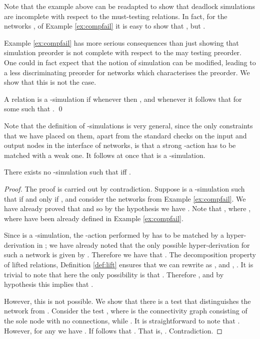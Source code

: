 \documentclass{LMCS}
\begin{document}
  Note that the example above can be readapted to show that 
  deadlock simulations are incomplete with respect to the 
  must-testing relations. 
  In fact, for the networks ,  of 
  Example \ref{ex:compfail} it is easy to show that 
  , but 
  . 
  
 Example \ref{ex:compfail} has more serious consequences than just showing that simulation 
  preorder is not complete with respect to the may testing preorder. 
  One could in fact expect that the notion of simulation can be modified, 
  leading to a less discriminating preorder for networks which characterises 
  the  preorder. We show that this is not the case. 
  
  \begin{defi}[-Simulations]
  A relation  is 
  a -simulation if whenever  then 
  ,  
  and whenever  it follows that 
   for some  such that 
  . \qed
  \end{defi}
  Note that the definition of -simulations is very general, 
  since the only constraints that we have placed on them, 
  apart from the standard checks on the input and output nodes 
  in the interface of networks, is that a strong -action 
  has to be matched with a weak one. It follows at once 
  that  is a -simulation.
    
  \begin{thm}
  \label{thm:nolift}
  There exists no -simulation  such that
   iff .
\end{thm}
  
  \begin{proof}
   The proof is carried out by contradiction. 
   Suppose   
   is a -simulation such that  
   if and only if , and consider the 
   networks  from Example \ref{ex:compfail}.
    We have already proved that  
   and so by the hypothesis we have . 
   Note that , 
   where , 
   where  have been already defined in Example \ref{ex:compfail}. 
         
   Since  is a -simulation, 
   the -action performed by  has to 
   be matched by a hyper-derivation in ; 
   we have already noted that the only possible hyper-derivation 
   for such a network is given by . Therefore we have that 
   . 
   The decomposition property of lifted relations, Definition 
   \ref{def:lift} ensures that we can rewrite 
    as , and  
   , 
   . It is trivial to note that here the only 
   possibility is that . 
   Therefore , 
   and by hypothesis this implies that . 
   
   However, this is not possible. We show that there is 
   a test that distinguishes the network  
   from .
   Consider the test , 
   where  is the connectivity graph consisting of 
   the sole node  with no connections, while 
   . 
   It is straightforward to note that 
   . 
   However, for any  
   we have . If follows that 
   . That is, 
   . Contradiction. 
  \end{proof}
\end{document}
